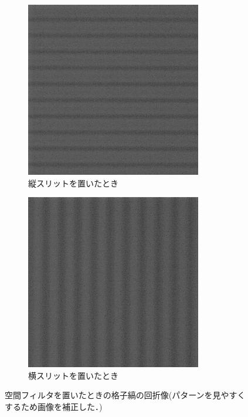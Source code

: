 \documentclass[titlepage]{jsarticle}
\begin{document}
\begin{figure}[htbp]
    \centering
    \begin{subfigure}{0.4\columnwidth}
        \centering
        \includegraphics[width=\columnwidth]{20um_vertical_slit_edit_tri.png}
        \caption{縦スリットを置いたとき}
        \label{fig:vslit}
    \end{subfigure}
    \begin{subfigure}{0.4\columnwidth}
        \centering
        \includegraphics[width=\columnwidth]{20um_horizontal_slit_edit_tri.png}
        \caption{横スリットを置いたとき}
        \label{fig:hslit}
    \end{subfigure}    
    \caption{空間フィルタを置いたときの格子縞の回折像(パターンを見やすくするため画像を補正した．)}
    \label{fig:filter}
\end{figure}
\end{document}
